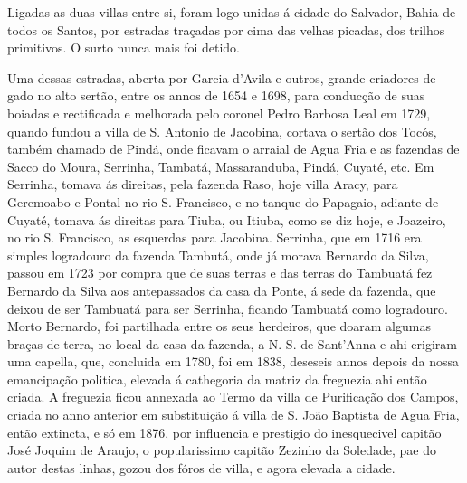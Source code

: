  \newpage Ligadas as duas villas entre si, foram logo unidas á cidade do Salvador, Bahia de todos os Santos, por estradas traçadas por cima das velhas picadas, dos trilhos primitivos. O surto nunca mais foi detido.\label{surto}
 
 Uma dessas  estradas, aberta por Garcia d'Avila e outros,  grande criadores de gado no alto sertão, entre os  annos de 1654 e 1698, para conducção de suas boiadas e rectificada e melhorada pelo coronel Pedro  Barbosa Leal em 1729, quando fundou a villa de S. Antonio de Jacobina,  cortava o sertão  dos Tocós, também chamado de Pindá, onde ficavam o arraial de  Agua Fria e as fazendas de Sacco do Moura, Serrinha, Tambatá, Massaranduba, Pindá, Cuyaté, etc. Em Serrinha, tomava ás direitas, pela fazenda  Raso, hoje villa Aracy, para Geremoabo e Pontal no rio S. Francisco, e  no tanque do Papagaio, adiante de Cuyaté, tomava ás direitas para Tiuba, ou Itiuba, como se diz hoje, e Joazeiro, no rio S. Francisco, as esquerdas para Jacobina. Serrinha, que em 1716 era simples logradouro da fazenda Tambutá, onde já morava Bernardo da Silva, passou em 1723 por compra que de suas terras e das terras do Tambuatá fez Bernardo da Silva aos antepassados da casa da Ponte, á sede da  fazenda, que deixou de ser Tambuatá para ser Serrinha, ficando Tambuatá como logradouro. Morto Bernardo, foi partilhada entre os seus herdeiros, que doaram algumas braças de terra, no local da casa da fazenda, a N. S. de Sant'Anna e ahi erigiram uma capella, que, concluida em 1780, foi em 1838, deseseis annos depois da  nossa emancipação  politica, elevada á cathegoria da  matriz da freguezia ahi então criada. A freguezia ficou annexada ao Termo da villa  de Purificação dos Campos, criada no anno anterior em substituição á villa de S. João Baptista de Agua Fria, então extincta, e só em 1876, por influencia e prestigio do inesquecivel capitão José  Joquim de Araujo, o popularissimo capitão Zezinho da Soledade, pae do autor destas linhas, gozou dos fóros de villa, e agora elevada a cidade.
 
 

